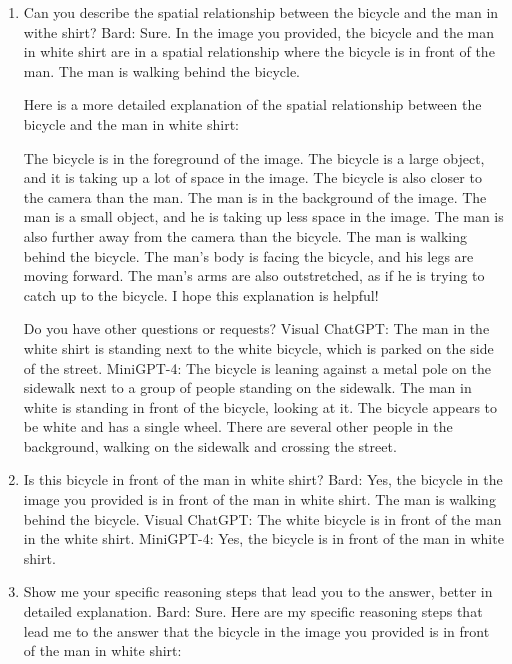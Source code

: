 \begin{enumerate}
    \item Can you describe the spatial relationship between the bicycle and the man in withe shirt?
    \subitem Bard: Sure. In the image you provided, the bicycle and the man in white shirt are in a spatial relationship where the bicycle is in front of the man. The man is walking behind the bicycle.

    Here is a more detailed explanation of the spatial relationship between the bicycle and the man in white shirt:
    
    The bicycle is in the foreground of the image. The bicycle is a large object, and it is taking up a lot of space in the image. The bicycle is also closer to the camera than the man.
    The man is in the background of the image. The man is a small object, and he is taking up less space in the image. The man is also further away from the camera than the bicycle.
    The man is walking behind the bicycle. The man's body is facing the bicycle, and his legs are moving forward. The man's arms are also outstretched, as if he is trying to catch up to the bicycle.
    I hope this explanation is helpful!
    
    Do you have other questions or requests?
    \subitem Visual ChatGPT: The man in the white shirt is standing next to the white bicycle, which is parked on the side of the street.
    \subitem MiniGPT-4: The bicycle is leaning against a metal pole on the sidewalk next to a group of people standing on the sidewalk. The man in white is standing in front of the bicycle, looking at it. The bicycle appears to be white and has a single wheel. There are several other people in the background, walking on the sidewalk and crossing the street.
    \item Is this bicycle in front of the man in white shirt?
    \subitem Bard: 
    Yes, the bicycle in the image you provided is in front of the man in white shirt. The man is walking behind the bicycle. 
    \subitem Visual ChatGPT: The white bicycle is in front of the man in the white shirt.
    \subitem MiniGPT-4: Yes, the bicycle is in front of the man in white shirt.
    \item Show me your specific reasoning steps that lead you to the answer, better in detailed explanation.
    \subitem Bard: 
    Sure. Here are my specific reasoning steps that lead me to the answer that the bicycle in the image you provided is in front of the man in white shirt:


\end{enumerate}
